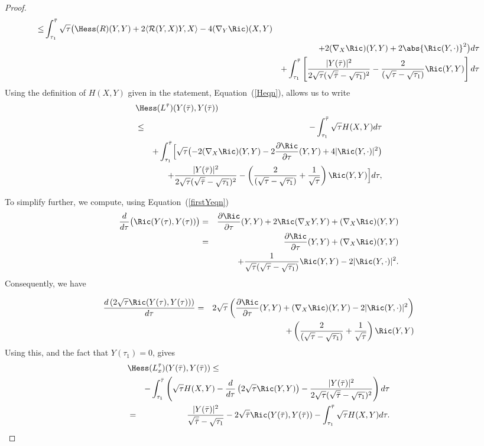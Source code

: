 \begin{proof}
\begin{eqnarray*}
\le & \int_{\tau_1}^{\bar\tau} \sqrt{\tau}\bigl(\Hess(R)(Y,Y) +
2\langle {\mathcal R}(Y,X)Y,X\rangle  - 4(\nabla_{Y}\Ric)(X,Y)\bigr. \\
& &  \ \ \ \ \bigl. +2(\nabla_X\Ric)(Y,Y) +
 2\abs{\Ric(Y,\cdot)}^{2}\bigr)d\tau \\ & &
 +\int_{\tau_1}^{\bar\tau}\left[
\frac{|Y(\bar\tau)|^2}{2\sqrt{\tau}(\sqrt{\bar\tau}-\sqrt{\tau_1})^2}
- \frac{2}{(\sqrt{\tau}-\sqrt{\tau_1})}\Ric(Y,Y)\right] d\tau
\end{eqnarray*}
 Using the definition of $H(X,Y)$ given in the statement, Equation~(\ref{Heqn}),
 allows us to write
\begin{eqnarray*}
\lefteqn{\Hess(L^{\bar\tau})(Y(\bar\tau),Y(\bar\tau))} \\
 & \le &
-\int_{\tau_1}^{\bar\tau}\sqrt{\tau}H(X,Y)d\tau \\ & &
+\int_{\tau_1}^{\bar\tau}\Bigl[\sqrt{\tau} \bigl(-2(\nabla_{X}\Ric)(Y,Y)
-2\frac{\partial\Ric}{\partial\tau}(Y,Y) +4|\Ric(Y,\cdot)|^2 \bigr) \Bigr.\\
& & \Bigl.+
\frac{|Y(\bar\tau)|^2}{2\sqrt{\tau}(\sqrt{\bar\tau}-\sqrt{\tau_1})^2}
-\left(\frac{2}{(\sqrt{\tau}-
\sqrt{\tau_1})}+\frac{1}{\sqrt{\tau}}\right) \Ric(Y,Y)\Bigr]d\tau,
\end{eqnarray*}

 To simplify
further, we compute, using Equation~(\ref{firstYeqn})
\begin{eqnarray*}
    \frac{d}{d\tau}\bigl(\Ric(Y(\tau),Y(\tau))\bigr) &= & \frac{\partial\Ric}{\partial{\tau}}(Y,Y) +
        2\Ric(\nabla_{X}Y,Y) + (\nabla_{X}\Ric)(Y,Y)\\
        & = & \frac{\partial\Ric}{\partial{\tau}}(Y,Y)+ (\nabla_{X}\Ric)(Y,Y) \\ & & +
\frac{1}{\sqrt{\tau}(\sqrt{\tau}-\sqrt{\tau_1})}\Ric(Y,Y) -
2|\Ric(Y,\cdot)|^{2}.
\end{eqnarray*}
 Consequently, we have

\begin{eqnarray*}
\frac{d\left(2\sqrt{\tau}\Ric(Y(\tau),Y(\tau))\right)}{d\tau} &
= & 2\sqrt{\tau}\left(\frac{\partial\Ric}{\partial{\tau}}(Y,Y)
+ (\nabla_{X}\Ric)(Y,Y)- 2|\Ric(Y,\cdot)|^{2}\right)\\
 & & + \left(\frac{2}{(\sqrt{\tau}-\sqrt{\tau_1})} +\frac{1}{\sqrt{\tau}}\right)\Ric(Y,Y)
\end{eqnarray*}
Using this, and the fact that $Y(\tau_1)=0$, gives
\begin{eqnarray}\label{Hessineq1}
\lefteqn{\Hess(L_x^{\bar\tau})(Y(\bar\tau),Y(\bar\tau)) \le}  \\
 &  &
-\int_{\tau_1}^{\bar\tau}\left(\sqrt{\tau}H(X,Y)
-\frac{d}{d\tau}\left(2\sqrt{\tau}\Ric(Y,Y)\right)
-\frac{|Y(\bar\tau)|^2}{2\sqrt{\tau}(\sqrt{\bar\tau}-\sqrt{\tau_1})^2}\right)d\tau \nonumber\\
 & = &
\frac{|Y(\bar\tau)|^2}{\sqrt{\bar\tau}-\sqrt{\tau_1}}
-2\sqrt{\bar\tau}\Ric(Y(\bar\tau),Y(\bar\tau))-\int_{\tau_1}^{\bar\tau}\sqrt{\tau}H(X,Y)d\tau.
\nonumber
\end{eqnarray}


\end{proof}
